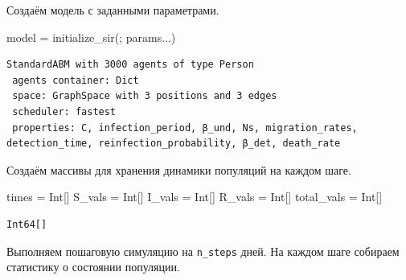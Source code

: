 \documentclass[
  12pt,
  a4paper,
  DIV=11,
  numbers=noendperiod]{scrreprt}
\newenvironment{Shaded}{\begin{snugshade}}{\end{snugshade}}
\newcommand{\DataTypeTok}[1]{\textcolor[rgb]{0.68,0.00,0.00}{#1}}
\newcommand{\FunctionTok}[1]{\textcolor[rgb]{0.28,0.35,0.67}{#1}}
\newcommand{\NormalTok}[1]{\textcolor[rgb]{0.00,0.23,0.31}{#1}}
\newcommand{\OperatorTok}[1]{\textcolor[rgb]{0.37,0.37,0.37}{#1}}
\begin{document}
Создаём модель с заданными параметрами.

\begin{Shaded}
\begin{Highlighting}[]
\NormalTok{model }\OperatorTok{=} \FunctionTok{initialize\_sir}\NormalTok{(; params}\OperatorTok{...}\NormalTok{)}
\end{Highlighting}
\end{Shaded}

\begin{verbatim}
StandardABM with 3000 agents of type Person
 agents container: Dict
 space: GraphSpace with 3 positions and 3 edges
 scheduler: fastest
 properties: C, infection_period, β_und, Ns, migration_rates, detection_time, reinfection_probability, β_det, death_rate
\end{verbatim}

Создаём массивы для хранения динамики популяций на каждом шаге.

\begin{Shaded}
\begin{Highlighting}[]
\NormalTok{times }\OperatorTok{=} \DataTypeTok{Int}\NormalTok{[]}
\NormalTok{S\_vals }\OperatorTok{=} \DataTypeTok{Int}\NormalTok{[]}
\NormalTok{I\_vals }\OperatorTok{=} \DataTypeTok{Int}\NormalTok{[]}
\NormalTok{R\_vals }\OperatorTok{=} \DataTypeTok{Int}\NormalTok{[]}
\NormalTok{total\_vals }\OperatorTok{=} \DataTypeTok{Int}\NormalTok{[]}
\end{Highlighting}
\end{Shaded}

\begin{verbatim}
Int64[]
\end{verbatim}

Выполняем пошаговую симуляцию на \texttt{n\_steps} дней. На каждом шаге
собираем статистику о состоянии популяции.
\end{document}
